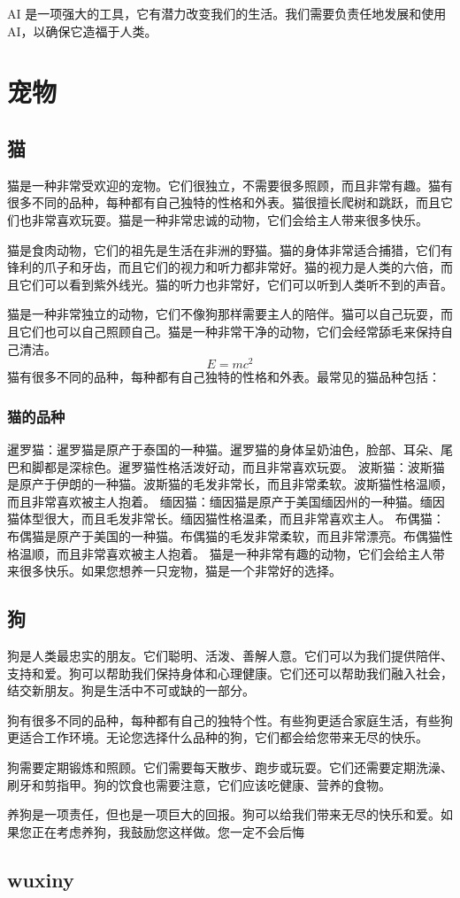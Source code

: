 \documentclass[engineeringmaster]{hquThesis}
\begin{document}
AI 是一项强大的工具，它有潜力改变我们的生活。我们需要负责任地发展和使用 AI，以确保它造福于人类。

\chapter{宠物}
\section{猫}
猫是一种非常受欢迎的宠物。它们很独立，不需要很多照顾，而且非常有趣。猫有很多不同的品种，每种都有自己独特的性格和外表。猫很擅长爬树和跳跃，而且它们也非常喜欢玩耍。猫是一种非常忠诚的动物，它们会给主人带来很多快乐。

猫是食肉动物，它们的祖先是生活在非洲的野猫。猫的身体非常适合捕猎，它们有锋利的爪子和牙齿，而且它们的视力和听力都非常好。猫的视力是人类的六倍，而且它们可以看到紫外线光。猫的听力也非常好，它们可以听到人类听不到的声音。

猫是一种非常独立的动物，它们不像狗那样需要主人的陪伴。猫可以自己玩耍，而且它们也可以自己照顾自己。猫是一种非常干净的动物，它们会经常舔毛来保持自己清洁。
\begin{equation}
E = mc^2
\end{equation}
猫有很多不同的品种，每种都有自己独特的性格和外表。最常见的猫品种包括：
\subsection{猫的品种}
暹罗猫：暹罗猫是原产于泰国的一种猫。暹罗猫的身体呈奶油色，脸部、耳朵、尾巴和脚都是深棕色。暹罗猫性格活泼好动，而且非常喜欢玩耍。
波斯猫：波斯猫是原产于伊朗的一种猫。波斯猫的毛发非常长，而且非常柔软。波斯猫性格温顺，而且非常喜欢被主人抱着。
缅因猫：缅因猫是原产于美国缅因州的一种猫。缅因猫体型很大，而且毛发非常长。缅因猫性格温柔，而且非常喜欢主人。
布偶猫：布偶猫是原产于美国的一种猫。布偶猫的毛发非常柔软，而且非常漂亮。布偶猫性格温顺，而且非常喜欢被主人抱着。
猫是一种非常有趣的动物，它们会给主人带来很多快乐。如果您想养一只宠物，猫是一个非常好的选择。

\section{狗}
狗是人类最忠实的朋友。它们聪明、活泼、善解人意。它们可以为我们提供陪伴、支持和爱。狗可以帮助我们保持身体和心理健康。它们还可以帮助我们融入社会，结交新朋友。狗是生活中不可或缺的一部分。

狗有很多不同的品种，每种都有自己的独特个性。有些狗更适合家庭生活，有些狗更适合工作环境。无论您选择什么品种的狗，它们都会给您带来无尽的快乐。

狗需要定期锻炼和照顾。它们需要每天散步、跑步或玩耍。它们还需要定期洗澡、刷牙和剪指甲。狗的饮食也需要注意，它们应该吃健康、营养的食物。

养狗是一项责任，但也是一项巨大的回报。狗可以给我们带来无尽的快乐和爱。如果您正在考虑养狗，我鼓励您这样做。您一定不会后悔
\section{wuxiny}
\end{document}
